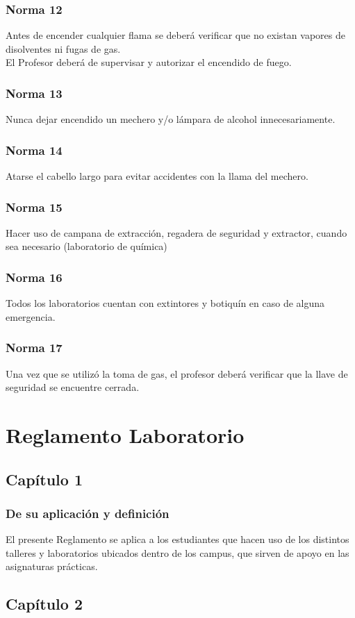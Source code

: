 \documentclass[14pt]{beamer}
\begin{document}
\begin{frame}
\frametitle{Norma 12}
Antes de encender cualquier flama se deberá verificar que no existan vapores de disolventes ni fugas de gas.
\\
\bigskip
\pause
El Profesor deberá de supervisar y autorizar el encendido de fuego.
\end{frame}
\begin{frame}
\frametitle{Norma 13}
Nunca dejar encendido un mechero y/o lámpara de alcohol innecesariamente.
\end{frame}
\begin{frame}
\frametitle{Norma 14}
Atarse el cabello largo para evitar accidentes con la llama del mechero.
\end{frame}
\begin{frame}
\frametitle{Norma 15}
Hacer uso de campana de extracción, regadera de seguridad y extractor, cuando sea necesario (laboratorio de química)
\end{frame}
\begin{frame}
\frametitle{Norma 16}
Todos los laboratorios cuentan con extintores y botiquín en caso de alguna emergencia.
\end{frame}
\begin{frame}
\frametitle{Norma 17}
Una vez que se utilizó la toma de gas, el profesor deberá verificar que la llave de seguridad se encuentre cerrada.
\end{frame}

\section{Reglamento Laboratorio}
\subsection{Capítulo 1}

\begin{frame}
\frametitle{De su aplicación y definición}
 El presente Reglamento se aplica a los estudiantes que hacen uso de los distintos talleres y laboratorios ubicados dentro de los campus, que sirven de apoyo en las asignaturas prácticas.
\end{frame}

\subsection{Capítulo 2}
\end{document}
